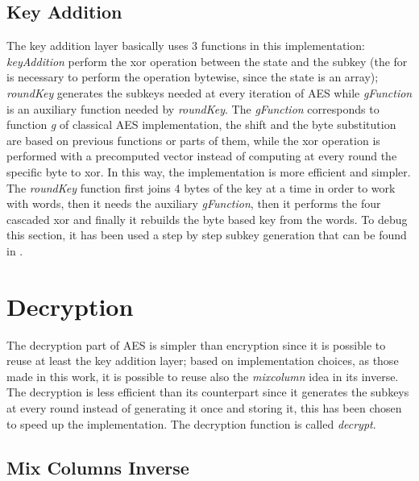 \documentclass{article}
\begin{document}
\subsection{Key Addition}

The key addition layer basically uses 3 functions in this implementation: \textit{keyAddition} perform the xor operation between the state and the subkey (the for is necessary to perform the operation bytewise, since the state is an array); \textit{roundKey} generates the subkeys needed at every iteration of AES while \textit{gFunction} is an auxiliary function needed by \textit{roundKey}. \newline
The \textit{gFunction} corresponds to function \textit{g} of classical AES implementation, the shift and the byte substitution are based on previous functions or parts of them, while the xor operation is performed with a precomputed vector instead of computing at every round the specific byte to xor. In this way, the implementation is more efficient and simpler.\newline
The \textit{roundKey} function first joins 4 bytes of the key at a time in order to work with words, then it needs the auxiliary \textit{gFunction}, then it performs the four cascaded xor and finally it rebuilds the byte based key from the words.\newline
To debug this section, it has been used a step by step subkey generation that can be found in \cite{AESsteps}.   


\section{Decryption}

The decryption part of AES is simpler than encryption since it is possible to reuse at least the key addition layer; based on implementation choices, as those made in this work, it is possible to reuse also the \textit{mixcolumn} idea in its inverse. The decryption is less efficient than its counterpart since it generates the subkeys at every round instead of generating it once and storing it, this has been chosen to speed up the implementation. The decryption function is called \textit{decrypt}.
 
\subsection{Mix Columns Inverse}
\end{document}

